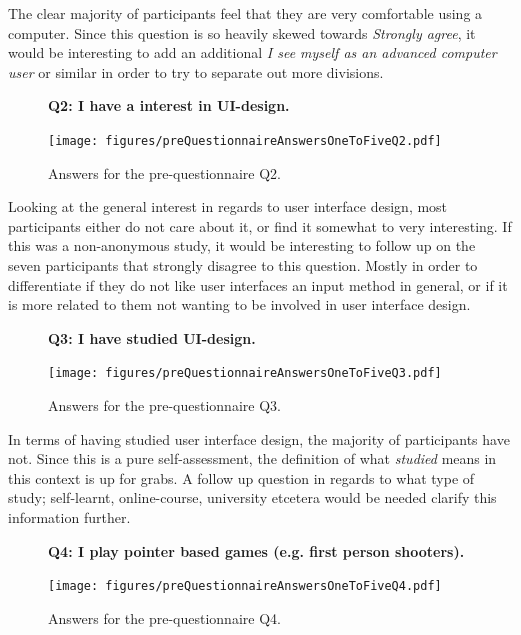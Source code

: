 \documentclass[nofilelist,dvipsnames]{cslthse-msc}
\begin{document}
{        The clear majority of participants feel that they are very comfortable
        using a computer. Since this question is so heavily skewed towards
        \textit{Strongly agree}, it would be interesting to add an additional
        \textit{I see myself as an advanced computer user} or similar in order
        to try to separate out more divisions.

				\begin{figure}[h!]
          \textbf{Q2: I have a interest in UI-design.}
          \begin{center}
            \texttt{[image: figures/preQuestionnaireAnswersOneToFiveQ2.pdf]}
            \vspace{-1cm}
            \caption{Answers for the pre-questionnaire Q2.}
          \end{center}
				\end{figure}

        Looking at the general interest in regards to user interface design,
        most participants either do not care about it, or find it somewhat to
        very interesting. If this was a non-anonymous study, it would be
        interesting to follow up on the seven participants that strongly
        disagree to this question. Mostly in order to differentiate if they do
        not like user interfaces an input method in general, or if it is more
        related to them not wanting to be involved in user interface design.

				\begin{figure}[h!]
          \textbf{Q3: I have studied UI-design.}
          \begin{center}
            \texttt{[image: figures/preQuestionnaireAnswersOneToFiveQ3.pdf]}
            \vspace{-1cm}
            \caption{Answers for the pre-questionnaire Q3.}
          \end{center}
				\end{figure}

        In terms of having studied user interface design, the majority of
        participants have not. Since this is a pure self-assessment, the
        definition of what \textit{studied} means in this context is up for
        grabs. A follow up question in regards to what type of study;
        self-learnt, online-course, university etcetera would be needed clarify
        this information further.

				\begin{figure}[h!]
          \textbf{Q4: I play pointer based games (e.g. first person shooters).}
          \begin{center}
            \texttt{[image: figures/preQuestionnaireAnswersOneToFiveQ4.pdf]}
            \vspace{-1cm}
            \caption{Answers for the pre-questionnaire Q4.}
          \end{center}
				\end{figure}

}
\end{document}
